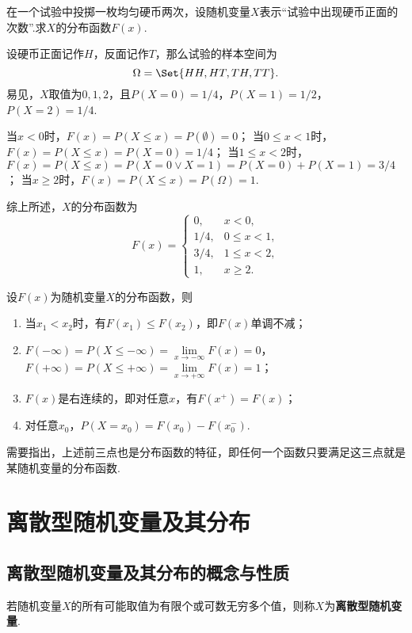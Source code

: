 \begin{example}
在一个试验中投掷一枚均匀硬币两次，设随机变量\(X\)表示“试验中出现硬币正面的次数”.求\(X\)的分布函数\(F(x)\).
\begin{solution}
设硬币正面记作\(H\)，反面记作\(T\)，那么试验的样本空间为\[
\Omega = \Set{ HH, HT, TH, TT }.
\]易见，\(X\)取值为\(0,1,2\)，且\(P(X=0) = 1/4\)，\(P(X=1) = 1/2\)，\(P(X=2) = 1/4\).

当\(x < 0\)时，\(F(x) = P(X \leqslant x) = P(\emptyset) = 0\)；
当\(0 \leqslant x < 1\)时，\(F(x) = P(X \leqslant x) = P(X=0) = 1/4\)；
当\(1 \leqslant x < 2\)时，\(F(x) = P(X \leqslant x) = P(X=0 \lor X=1) = P(X=0)+P(X=1) = 3/4\)；
当\(x \geqslant 2\)时，\(F(x) = P(X \leqslant x) = P(\Omega) = 1\).

综上所述，\(X\)的分布函数为\[
F(x) = \left\{ \begin{array}{cl}
0, & x < 0, \\
1/4, & 0 \leqslant x < 1, \\
3/4, & 1 \leqslant x < 2, \\
1, & x \geqslant 2.
\end{array} \right.
\]
\end{solution}
\end{example}

\begin{property}
设\(F(x)\)为随机变量\(X\)的分布函数，则
\begin{enumerate}
\item 当\(x_1 < x_2\)时，有\(F(x_1) \leqslant F(x_2)\)，即\(F(x)\)单调不减；
\item \(F(-\infty)=P(X \leqslant -\infty) = \lim\limits_{x \to -\infty}{F(x)} = 0\)，%
\(F(+\infty)=P(X \leqslant +\infty) = \lim\limits_{x \to +\infty}{F(x)} = 1\)；
\item \(F(x)\)是右连续的，即对任意\(x\)，有\(F(x^+)=F(x)\)；
\item 对任意\(x_0\)，\(P(X=x_0)=F(x_0)-F(x_0^-)\).
\end{enumerate}

需要指出，上述前三点也是分布函数的特征，即任何一个函数只要满足这三点就是某随机变量的分布函数.
\end{property}

\section{离散型随机变量及其分布}
\subsection{离散型随机变量及其分布的概念与性质}
\begin{definition}
若随机变量\(X\)的所有可能取值为有限个或可数无穷多个值，则称\(X\)为\textbf{离散型随机变量}.
\end{definition}

